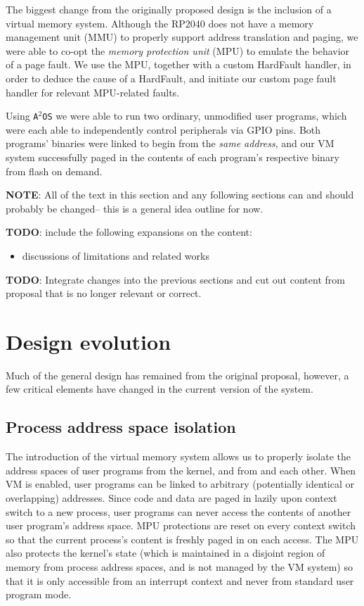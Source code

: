 \documentclass[12pt]{article}
\newcommand{\os}{\texttt{A$^2$OS} }
\begin{document}
The biggest change from the originally proposed design is the inclusion of a
virtual memory system. Although the RP2040 does not have a memory management
unit (MMU) to properly support address translation and paging, we were able
to co-opt the \emph{memory protection unit} (MPU) to emulate the behavior of a
page fault. We use the MPU, together with a custom HardFault handler, in order
to deduce the cause of a HardFault, and initiate our custom page fault handler
for relevant MPU-related faults.

Using \os we were able to run two ordinary, unmodified user programs, which were
each able to independently control peripherals via GPIO pins. Both programs'
binaries were linked to begin from the \emph{same address}, and our VM system
successfully paged in the contents of each program's respective binary from
flash on demand.

\textbf{NOTE}: All of the text in this section and any following sections can
and should probably be changed-- this is a general idea outline for now.

\textbf{TODO}: include the following expansions on the content:

\begin{itemize}
    \item discussions of limitations and related works
\end{itemize}

\textbf{TODO}: Integrate changes into the previous sections and cut out content
from proposal that is no longer relevant or correct.
\vspace{1em}



\section{Design evolution}
Much of the general design has remained from the original proposal, however, a
few critical elements have changed in the current version of the system.

\subsection{Process address space isolation}
The introduction of the virtual memory system allows us to properly isolate
the address spaces of user programs from the kernel, and from and each other.
When VM is enabled, user programs can be linked to arbitrary (potentially
identical or overlapping) addresses. Since code and data are paged in lazily
upon context switch to a new process, user programs can never access the
contents of another user program's address space. MPU protections are reset on
every context switch so that the current process's content is freshly paged in
on each access. The MPU also protects the kernel's state (which is maintained in
a disjoint region of memory from process address spaces, and is not managed by
the VM system) so that it is only accessible from an interrupt context and never
from standard user program mode.
\end{document}
